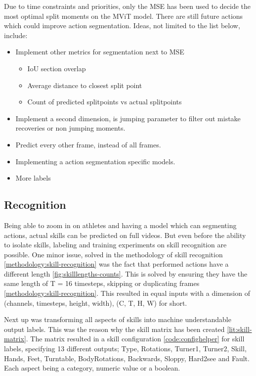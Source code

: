 Due to time constraints and priorities, only the MSE has been used to decide the most optimal split moments on the MViT model. There are still future actions which could improve action segmentation. Ideas, not limited to the list below, include:

\begin{itemize}
    \item Implement other metrics for segmentation next to MSE \\
        \begin{itemize}
            \item IoU section overlap
            \item Average distance to closest split point
            \item Count of predicted splitpoints vs actual splitpoints
        \end{itemize}
    \item Implement a second dimension, is jumping parameter to filter out mistake recoveries or non jumping moments.
    \item Predict every other frame, instead of all frames.
    \item Implementing a action segmentation specific models.
    \item More labels
\end{itemize} 

\subsection{Recognition}

Being able to zoom in on athletes and having a model which can segmenting actions, actual skills can be predicted on full videos.
But even before the ability to isolate skills, labeling and training experiments on skill recognition are possible. One minor issue, solved in the methodology of skill recognition \ref{methodology:skill-recognition} was the fact that performed actions have a different length \ref{fig:skilllengths-counts}. This is solved by ensuring they have the same length of T = 16 timesteps, skipping or duplicating frames \ref{methodology:skill-recognition}. This resulted in equal inputs with a dimension of (channels, timesteps, height, width), (C, T, H, W) for short.

Next up was transforming all aspects of skills into machine understandable output labels. This was the reason why the skill matrix has been created \ref{lit:skill-matrix}. The matrix resulted in a skill configuration \ref{code:confighelper} for skill labels, specifying 13 different outputs; Type, Rotations, Turner1, Turner2, Skill, Hands, Feet, Turntable, BodyRotations, Backwards, Sloppy, Hard2see and Fault. Each aspect being a category, numeric value or a boolean.

